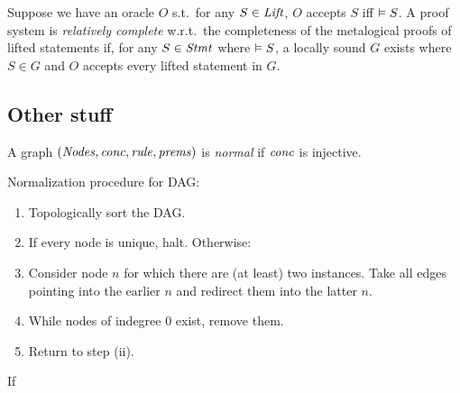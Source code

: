 \begin{definition}
    Suppose we have an oracle $O$ s.t.\
    for any $S \in \mathit{Lift}$,
    $O$ accepts $S$ iff $\vDash S$.
    A proof system is \emph{relatively complete} w.r.t.\
    the completeness of the metalogical proofs of lifted statements
    if, for any $S \in \mathit{Stmt}$ where $\vDash S$,
    a locally sound $G$ exists where $S \in G$
    and $O$ accepts every lifted statement in $G$.
\end{definition}

\subsection{Other stuff}

\begin{definition}
    A graph $(\mathit{Nodes},\mathit{conc},\mathit{rule},\mathit{prems})$
    is \emph{normal} if
    $\mathit{conc}$ is injective.
\end{definition}

Normalization procedure for DAG:
\begin{enumerate}[label=(\roman*)]
    \item Topologically sort the DAG.
    \item If every node is unique, halt. Otherwise:
    \item Consider node $n$ for which there are (at least) two instances.
        Take all edges pointing into the earlier $n$ and redirect them into the latter $n$.
    \item While nodes of indegree 0 exist, remove them.
    \item Return to step (ii).
\end{enumerate}

\begin{conjecture}
If 
\end{conjecture}

\iffalse
\subsection{Admissibility}

\begin{definition}
    Consider a proof system with a set of rules $\DomRule$.
    A rule with premises $S_i$ and conclusion $C$ 
    is \emph{acyclically admissible} w.r.t.\ $\DomRule$ if
    $\forall i.\ \DER S_i \implies \DER C$.
\end{definition}
\fi